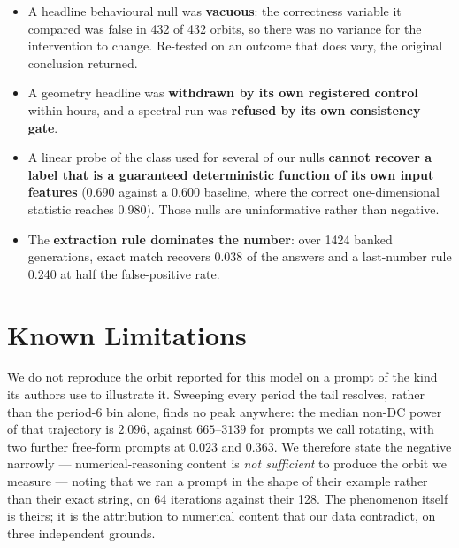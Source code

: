 \documentclass{zapiski}
\begin{document}
\begin{itemize}
\item A headline behavioural null was \textbf{vacuous}: the correctness variable it compared was
false in 432 of 432 orbits, so there was no variance for the intervention to change. Re-tested on
an outcome that does vary, the original conclusion returned.
\item A geometry headline was \textbf{withdrawn by its own registered control} within hours, and a
spectral run was \textbf{refused by its own consistency gate}.
\item A linear probe of the class used for several of our nulls \textbf{cannot recover a label
that is a guaranteed deterministic function of its own input features} (0.690 against a 0.600
baseline, where the correct one-dimensional statistic reaches 0.980). Those nulls are
uninformative rather than negative.
\item The \textbf{extraction rule dominates the number}: over 1424 banked generations, exact match
recovers 0.038 of the answers and a last-number rule 0.240 at half the false-positive rate.
\end{itemize}

\section{Known Limitations}

We do not reproduce the orbit reported for this model on a prompt of the kind its authors use to
illustrate it. Sweeping every period the tail resolves, rather than the period-6 bin alone, finds
no peak anywhere: the median non-DC power of that trajectory is $2.096$, against $665$--$3139$ for
prompts we call rotating, with two further free-form prompts at $0.023$ and $0.363$. We therefore
state the negative narrowly --- numerical-reasoning content is \emph{not sufficient} to produce the
orbit we measure --- noting that we ran a prompt in the shape of their example rather than their
exact string, on 64 iterations against their 128. The phenomenon itself is theirs; it is the
attribution to numerical content that our data contradict, on three independent grounds.
\end{document}
